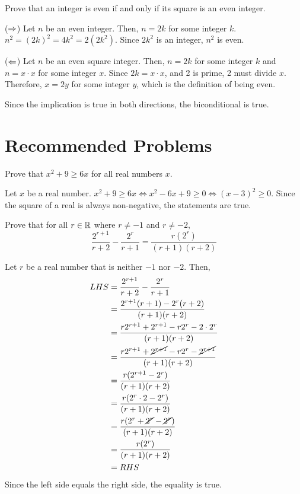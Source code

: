 \begin{warmup}
  Prove that an integer is even if and only if its square is an even integer.
\end{warmup}
\begin{prf}
  ($\Rightarrow$) Let $n$ be an even integer.
  Then, $n=2k$ for some integer $k$.
  $n^2=(2k)^2=4k^2=2(2k^2)$.
  Since $2k^2$ is an integer, $n^2$ is even.

  ($\Leftarrow$) Let $n$ be an even square integer.
  Then, $n=2k$ for some integer $k$ and $n=x\cdot x$ for some integer $x$.
  Since $2k=x\cdot x$, and 2 is prime, 2 must divide $x$.
  Therefore, $x=2y$ for some integer $y$, which is the definition of being even.

  Since the implication is true in both directions, the biconditional is true.
\end{prf}


\section{Recommended Problems}
\begin{recommended}
  Prove that $x^2 + 9 \geq 6x$ for all real numbers $x$.
\end{recommended}
\begin{prf}
  Let $x$ be a real number.
  $x^2+9 \geq 6x \iff x^2-6x+9 \geq 0 \iff (x-3)^2 \geq 0$.
  Since the square of a real is always non-negative, the statements are true.
\end{prf}


\begin{recommended}
  Prove that for all $r\in\mathbb{R}$ where $r\neq -1$ and $r\neq -2$,
  \begin{equation*}
    \frac{2^{r+1}}{r+2}-\frac{2^r}{r+1}=\frac{r(2^r)}{(r+1)(r+2)}
  \end{equation*}
\end{recommended}
\begin{prf}
  Let $r$ be a real number that is neither $-1$ nor $-2$.
  Then,
  \begin{align*}
    LHS & = \frac{2^{r+1}}{r+2}-\frac{2^r}{r+1}                                      \\
        & = \frac{2^{r+1}(r+1) - 2^r(r+2)}{(r+1)(r+2)}                               \\
        & = \frac{r2^{r+1} + 2^{r+1} - r2^r - 2\cdot 2^r}{(r+1)(r+2)}                \\
        & = \frac{r2^{r+1} + \cancel{2^{r+1}} - r2^r - \cancel{2^{r+1}}}{(r+1)(r+2)} \\
        & = \frac{r(2^{r+1} - 2^r)}{(r+1)(r+2)}                                      \\
        & = \frac{r(2^r\cdot 2 - 2^r)}{(r+1)(r+2)}                                   \\
        & = \frac{r(2^r + \cancel{2^r} - \cancel{2^r})}{(r+1)(r+2)}                  \\
        & = \frac{r(2^r)}{(r+1)(r+2)}                                                \\
        & = RHS
  \end{align*}
  Since the left side equals the right side, the equality is true.
\end{prf}


